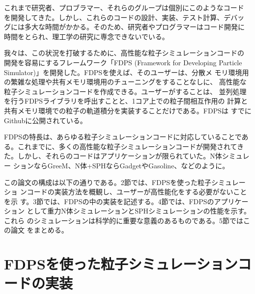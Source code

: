 \documentclass[12pt,a4paper]{jarticle}
\begin{document}
これまで研究者、プロブラマー、それらのグループは個別にこのようなコード
を開発してきた。しかし、これらのコードの設計、実装、テスト計算、デバッ
グには多大な時間がかかる。そのため、研究者やプログラマーはコード開発に
時間をとられ、理工学の研究に専念できないでいる。

我々は、この状況を打破するために、高性能な粒子シミュレーションコードの
開発を容易にするフレームワーク「FDPS (Framework for Developing
  Particle Simulator)」を開発した。FDPSを使えば、そのユーザーは、分散メ
モリ環境用の繁雑な処理や共有メモリ環境用のチューニングをすることなしに、
高性能な粒子シミュレーションコードを作成できる。ユーザーがすることは、
並列処理を行うFDPSライブラリを呼出すことと、1コア上での粒子間相互作用の
計算と共有メモリ環境での粒子の軌道積分を実装することだけである。FDPSは
すでにGithubに公開されている。

FDPSの特長は、あらゆる粒子シミュレーションコードに対応していることであ
る。これまでに、多くの高性能な粒子シミュレーションコードが開発されてき
た。しかし、それらのコードはアプリケーションが限られていた。N体シミュレー
ションならGreeM、N体+SPHならGadgetやGasoline、などのように。

この論文の構成は以下の通りである。2節では、FDPSを使った粒子シミュレーショ
ンコードの実装方法を概観し、ユーザーが高性能化をする必要がないことを示
す。3節では、FDPSの中の実装を記述する。4節では、FDPSのアプリケーション
として重力N体シミュレーションとSPHシミュレーションの性能を示す。これら
のシミュレーションは科学的に重要な意義のあるものである。5節ではこの論文
をまとめる。

\section{FDPSを使った粒子シミュレーションコードの実装}
\end{document}
